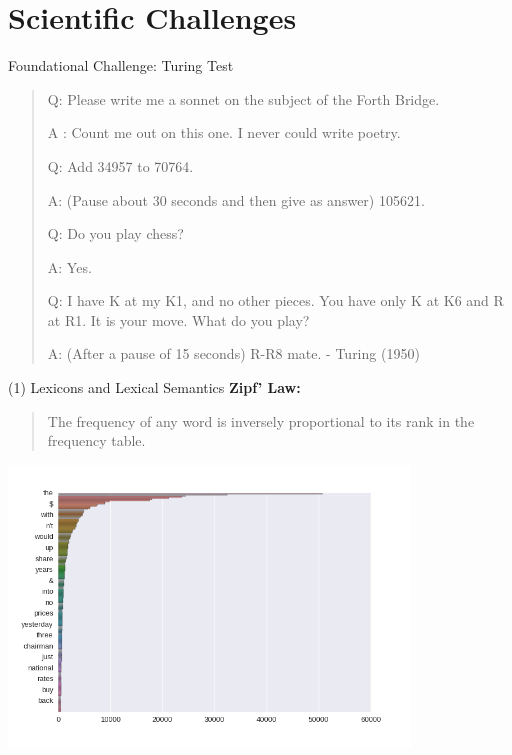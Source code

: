 \documentclass{beamer}
\begin{document}
\section{Scientific Challenges}

\begin{frame}{Foundational Challenge: Turing Test}
  \begin{quote}
    Q: Please write me a sonnet on the subject of the Forth Bridge.

    A : Count me out on this one. I never could write poetry.

    Q: Add 34957 to 70764.
    
    A: (Pause about 30 seconds and then give as answer) 105621.
    
    Q: Do you play chess?
    
    A: Yes.
    
    Q: I have K at my K1, and no other pieces. You have only K at K6 and R at R1. It is your move. What do you play?

    A: (After a pause of 15 seconds) R-R8 mate.
      {\normalfont - Turing (1950)}
  \end{quote}

\end{frame}

\begin{frame}{(1) Lexicons and Lexical Semantics}
  \textbf{Zipf' Law:}
  \begin{quote}
    The frequency of any word is inversely proportional to its rank in the frequency table.
  \end{quote}


     \begin{center}
       \includegraphics[width=0.8\textwidth]{../notebooks/zipf}         
     \end{center}
\end{frame}
\end{document}
